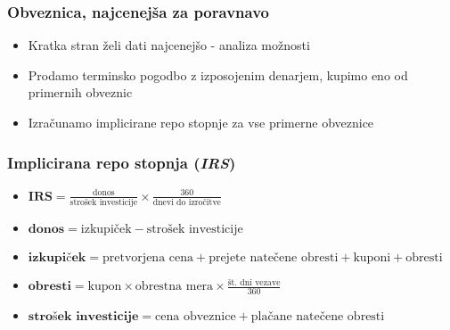 \documentclass[14pt]{beamer}
\begin{document}
\begin{frame}
    \frametitle{Obveznica, najcenejša za poravnavo}
    
    \begin{itemize}
        \item Kratka stran želi dati najcenejšo - analiza možnosti
        \item Prodamo terminsko pogodbo z izposojenim denarjem, 
                kupimo eno od primernih obveznic
        \item Izračunamo implicirane repo stopnje za vse primerne obveznice
    \end{itemize}


\end{frame}


\begin{frame}
    \frametitle{Implicirana repo stopnja (\textit{IRS})}
    
    \begin{itemize}
        \item \textit{$ \textbf{IRS} = \frac{\text{donos}}{\text{strošek investicije}} 
                \times \frac{360}{\text{dnevi do izročitve}} $}
        \item \textit{$ \textbf{donos} = \text{izkupiček} - \text{strošek investicije} $}
        \item \textit{$ \textbf{izkupiček} = \text{pretvorjena cena} + \text{prejete natečene obresti} 
                + \text{kuponi} + \text{obresti} $}
        \item \textit{$ \textbf{obresti} =  \text{kupon} \times \text{obrestna mera} \times 
                \frac{\text{št. dni vezave}}{360} $}
        \item \textit{$ \textbf{strošek investicije} = \text{cena obveznice} + 
                \text{plačane natečene obresti}$}
    \end{itemize}


\end{frame}
\end{document}

